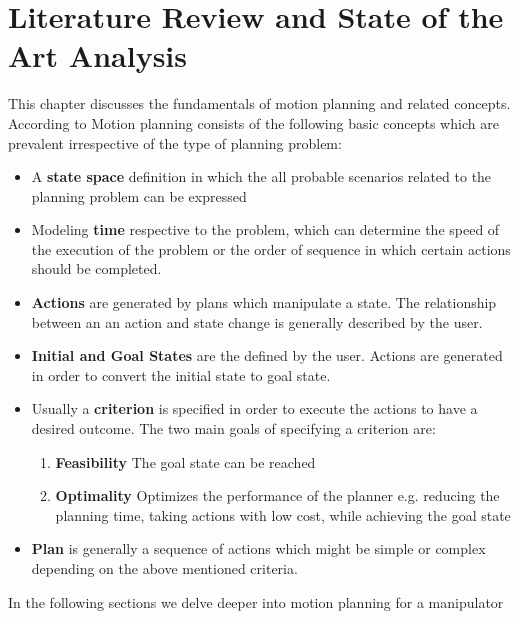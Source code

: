  \section{Literature Review and State of the Art Analysis}

This chapter discusses the fundamentals of motion planning and related concepts. According to \cite{1} Motion planning consists of the following basic concepts which are prevalent irrespective of the type of planning problem:
\begin{itemize}
\item A \textbf{state space} definition in which the all probable scenarios related to the planning problem can be expressed
\item Modeling \textbf{time} respective to the problem, which can determine the speed of the execution of the problem or the order of sequence in which certain actions should be completed.
\item \textbf{Actions} are generated by plans which manipulate a state. The relationship between an an action and state change is generally described by the user. 
\item \textbf{Initial and Goal States} are the defined by the user. Actions are generated in order to convert the initial state to goal state.
\item Usually a \textbf{criterion} is specified in order to execute the actions to have a desired outcome. The two main goals of specifying a criterion are:
\begin{enumerate}
\item \textbf{Feasibility} The goal state can be reached 
\item \textbf{Optimality} Optimizes the performance of the planner e.g. reducing the planning time, taking actions with low cost, while achieving the goal state 
\end{enumerate}
\item \textbf{Plan} is generally a sequence of actions which might be simple or complex depending on the above mentioned criteria. 
\end{itemize}
In the following sections we delve deeper into motion planning for a manipulator 


